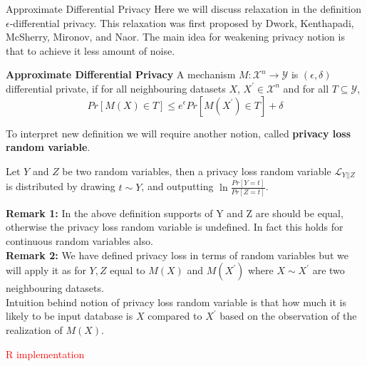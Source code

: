 \documentclass[aspectratio=169]{beamer}
\newcommand{\tcr}{\textcolor{red}}
\begin{document}
\begin{frame}[allowframebreaks]{Approximate Differential Privacy}
Here we will discuss relaxation in the definition $\epsilon$-differential privacy. This relaxation was first proposed by Dwork, Kenthapadi, McSherry, Mironov, and Naor. The main idea for weakening privacy notion is that to achieve it less amount of noise.

\begin{definition}
\textbf{Approximate Differential Privacy} A mechanism $M:\mathscr{X}^n \rightarrow \mathscr{Y}$ is $(\epsilon, \delta)$ differential private, if for all neighbouring datasets $X$, $X^\prime \in \mathscr{X}^n$ and for all $T \subseteq \mathscr{Y}$,
$$Pr[M(X) \in T] \leq e^\epsilon Pr[M(X^\prime) \in T] + \delta$$
\end{definition}
To interpret new definition we will require another notion, called \textbf{privacy loss random
variable}.
 
\begin{definition}
Let $Y$ and $Z$ be two random variables, then a privacy loss random variable $\mathscr{L}_{Y||Z}$ is distributed by drawing $t \sim Y$, and outputting $\ln{\frac{Pr[Y=t]}{Pr[Z=t]}}$.
\end{definition}
\textbf{Remark 1: }In the above definition supports of Y and Z are should be equal, otherwise the privacy loss random variable is undefined. In fact this holds for continuous random variables also.\\
\textbf{Remark 2: }We have defined privacy loss in terms of random variables but we will apply it as for $Y, Z$ equal to $M(X)$ and $M(X^\prime)$ where $X \sim X^\prime$ are two neighbouring datasets.\\
Intuition behind notion of privacy loss random variable is that how much it is likely to be input database is $X$ compared to $X^\prime$ based on the observation of the realization of $M(X)$.
\end{frame}










\begin{frame}
\begin{center}
\Huge \tcr{R implementation}
\end{center}
\begin{figure}[!ht]
        \centering
        \label{fig:lap}
\end{figure}
\end{frame}
\end{document}
